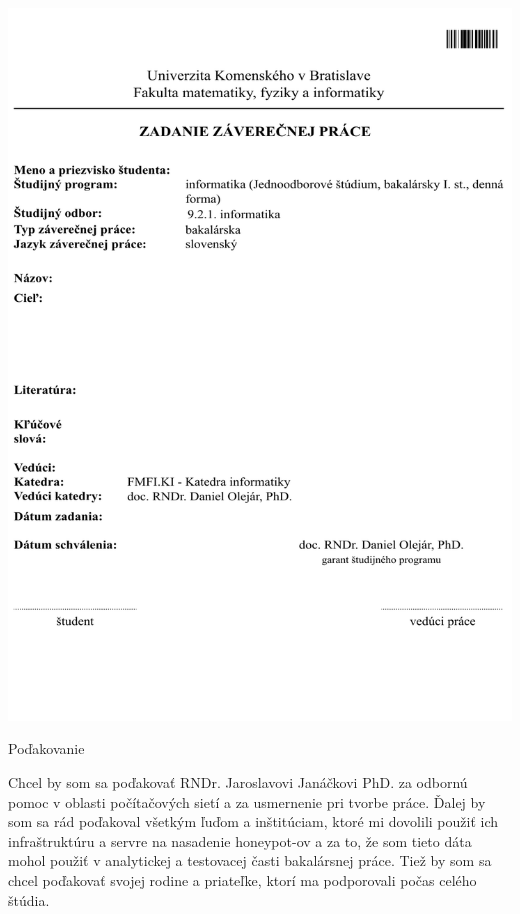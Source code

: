 \documentclass[12pt, oneside]{book}
\begin{document}
\newpage 
\thispagestyle{empty}
\hspace{-3cm}\includegraphics[width=1.4\textwidth]{images/zadanie.pdf}


\frontmatter

\newpage 
\thispagestyle{empty}

\vfill
\huge{Poďakovanie}
\normalsize
\newline

Chcel by som sa poďakovať RNDr. Jaroslavovi Janáčkovi PhD. za odbornú pomoc v oblasti počítačových sietí a za usmernenie pri tvorbe práce.
Ďalej by som sa rád poďakoval všetkým ľuďom a inštitúciam, ktoré mi dovolili použiť ich infraštruktúru a servre na nasadenie honeypot-ov a za to, že som tieto dáta mohol použiť v analytickej a testovacej časti bakalársnej práce.
Tiež by som sa chcel poďakovať svojej rodine a priateľke, ktorí ma podporovali počas celého štúdia.
\end{document}
